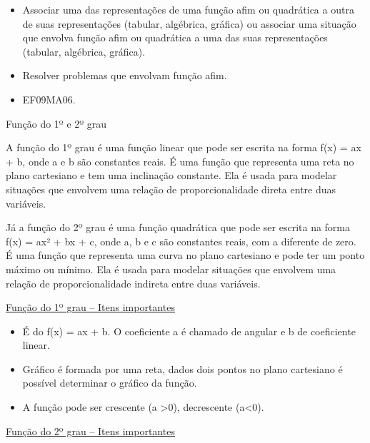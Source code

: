 \begin{escolha}
{{{\begin{escolha}
{{{

\begin{itemize}

  \item Associar uma das representações de uma função afim ou quadrática a
outra de suas representações (tabular, algébrica, gráfica) ou associar uma
situação que envolva função afim ou quadrática a uma das suas
representações (tabular, algébrica, gráfica).
  \item Resolver problemas que envolvam função afim.  

\end{itemize} 


\begin{itemize}
  \item EF09MA06.
\end{itemize}


Função do 1º e 2º grau


A função do 1º grau é uma função linear que pode ser escrita na forma
f(x) = ax + b, onde a e b são constantes reais. É uma função que
representa uma reta no plano cartesiano e tem uma inclinação constante.
Ela é usada para modelar situações que envolvem uma relação de
proporcionalidade direta entre duas variáveis.

Já a função do 2º grau é uma função quadrática que pode ser escrita na
forma f(x) = ax² + bx + c, onde a, b e c são constantes reais, com a
diferente de zero. É uma função que representa uma curva no plano
cartesiano e pode ter um ponto máximo ou mínimo. Ela é usada para
modelar situações que envolvem uma relação de proporcionalidade indireta
entre duas variáveis.

\ul{Função do 1º grau -- Itens importantes}

\begin{itemize}
\item
  É do f(x) = ax + b. O coeficiente a é chamado de angular e b de
  coeficiente linear.
\item
  Gráfico é formada por uma reta, dados dois pontos no plano cartesiano
  é possível determinar o gráfico da função.
\item
  A função pode ser crescente (a \textgreater0), decrescente
  (a\textless0).
\end{itemize}

\ul{Função do 2º grau -- Itens importantes}

}}}
\end{escolha}}}}
\end{escolha}
